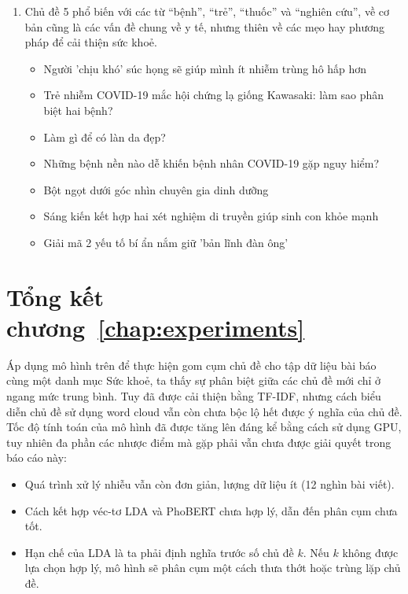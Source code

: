 \begin{enumerate}


    \item Chủ đề 5 phổ biến với các từ ``bệnh'', ``trẻ'', ``thuốc'' và ``nghiên cứu'', về cơ bản cũng là các vấn đề chung về y tế, nhưng thiên về các mẹo hay phương pháp để cải thiện sức khoẻ.
        \begin{itemize}
            \item Người 'chịu khó' súc họng sẽ giúp mình ít nhiễm trùng hô hấp hơn
            \item Trẻ nhiễm COVID-19 mắc hội chứng lạ giống Kawasaki: làm sao phân biệt hai bệnh?
            \item Làm gì để có làn da đẹp?
            \item Những bệnh nền nào dễ khiến bệnh nhân COVID-19 gặp nguy hiểm?
            \item Bột ngọt dưới góc nhìn chuyên gia dinh dưỡng
            \item Sáng kiến kết hợp hai xét nghiệm di truyền giúp sinh con khỏe mạnh
            \item Giải mã 2 yếu tố bí ẩn nắm giữ 'bản lĩnh đàn ông'
        \end{itemize}
\end{enumerate}


\section{Tổng kết chương~\ref{chap:experiments}}
Áp dụng mô hình trên để thực hiện gom cụm chủ đề cho tập dữ liệu bài báo cùng một danh mục Sức khoẻ, ta thấy sự phân biệt giữa các chủ đề mới chỉ ở ngang mức trung bình. Tuy đã được cải thiện bằng TF-IDF, nhưng cách biểu diễn chủ đề sử dụng word cloud vẫn còn chưa bộc lộ hết được ý nghĩa của chủ đề. Tốc độ tính toán của mô hình đã được tăng lên đáng kể bằng cách sử dụng GPU, tuy nhiên đa phần các nhược điểm mà \cite{lamGomCumVan2021} gặp phải vẫn chưa được giải quyết trong báo cáo này:

\begin{itemize}
    \item Quá trình xử lý nhiễu vẫn còn đơn giản, lượng dữ liệu ít (12 nghìn bài viết).
    \item Cách kết hợp véc-tơ LDA và PhoBERT chưa hợp lý, dẫn đến phân cụm chưa tốt.
    \item Hạn chế của LDA là ta phải định nghĩa trước số chủ đề $k$. Nếu $k$ không được lựa chọn hợp lý, mô hình sẽ phân cụm một cách thưa thớt hoặc trùng lặp chủ đề.
\end{itemize}

